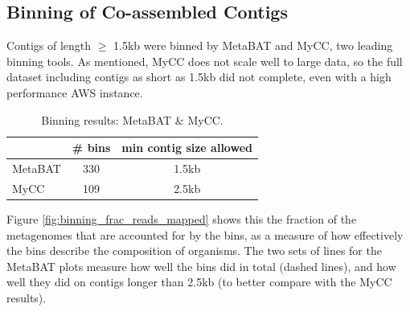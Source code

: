 \subsection{Binning of Co-assembled Contigs}

Contigs of length $\geq$ 1.5kb were binned by MetaBAT and MyCC, two leading binning tools.
As mentioned, MyCC does not scale well to large data, so the full dataset including contigs as short as 1.5kb did not complete, even with a high performance AWS instance.

\begin{table}[H]
\centering
\begin{singlespace}
\caption[Binning results: MetaBAT \& MyCC]
	{Binning results: MetaBAT \& MyCC.}
\label{table:sample_read_sizes}
\begin{tabular}{l | cc}
            & \# bins &  min contig size allowed \\  %
\midrule
	MetaBAT & 330   & 1.5kb \\
	MyCC    & 109   & 2.5kb \\


\end{tabular}
\end{singlespace}
\end{table}

Figure \ref{fig:binning_frac_reads_mapped} shows this the fraction of the metagenomes that are accounted for by the bins, as a measure of how effectively the bins describe the composition of organisms.
The two sets of lines for the MetaBAT plots measure how well the bins did in total (dashed lines), and how well they did on contigs longer than 2.5kb (to better compare with the MyCC results).

